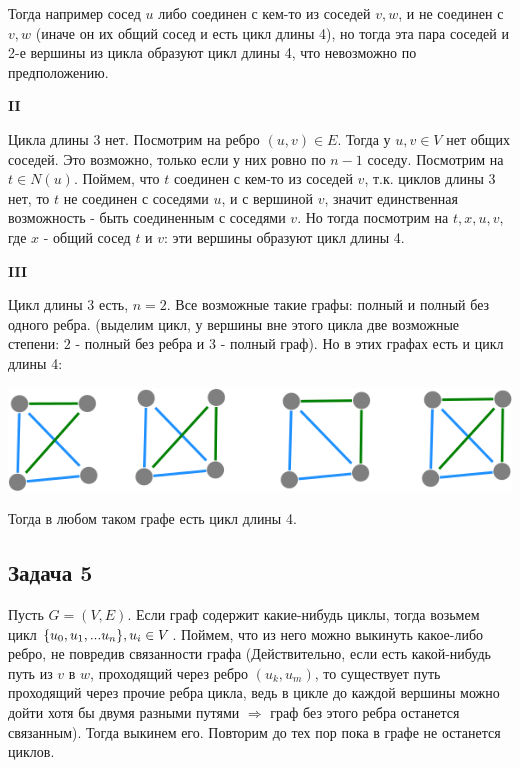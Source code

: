 \documentclass{article}
\begin{document}
 Тогда например сосед $u$ либо соединен с кем-то из соседей $v, w$, и не соединен с $v, w$ (иначе он их общий сосед и есть цикл длины 4), но тогда эта пара соседей и 2-е вершины из цикла образуют цикл длины 4, что невозможно по предположению. 

\textbf{II}

Цикла длины 3 нет. Посмотрим на ребро $(u, v) \in E$. Тогда у $u, v \in V$ нет общих соседей. Это  возможно, только если у них ровно по $ n - 1 $ соседу. Посмотрим на $t \in N(u)$. Поймем, что $t$ соединен с кем-то из соседей $v$, т.к. циклов длины 3 нет, то $t$ не соединен с соседями $u$, и с вершиной $v$, значит единственная возможность - быть соединенным с соседями $v$. Но тогда посмотрим на ${t, x, u, v}$, где $x$ - общий сосед $t$ и $v$: эти вершины образуют цикл длины 4.
 
\textbf{III}

Цикл длины 3 есть, $n = 2$. Все возможные такие графы: полный и полный без одного ребра. (выделим цикл, у вершины вне этого цикла две возможные степени: $2$ - полный без ребра и $3$ - полный граф). Но в этих графах есть и цикл длины 4:

\includegraphics[scale=0.5]{3_5.png}

Тогда в любом таком графе есть цикл длины 4.
 
 
\begin{center}
	\subsection*{Задача 5}
\end{center}

Пусть $ G = (V, E) $. 
Если граф содержит какие-нибудь циклы, тогда возьмем цикл $ \{u_0, u_1, ... u_n\},\space u_i \in V$. Поймем, что из него можно выкинуть какое-либо ребро, не повредив связанности графа (Действительно, если есть какой-нибудь путь из $v $ в $w$, проходящий через ребро $ (u_k, u_m) $, то существует путь проходящий через прочие ребра цикла, ведь в цикле до каждой вершины можно дойти хотя бы двумя разными путями $\Rightarrow$ граф без этого ребра останется связанным). Тогда выкинем его. Повторим до тех пор пока в графе не останется циклов. 
\end{document}
